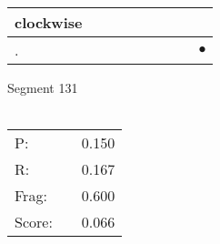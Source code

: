 \documentclass[landscape]{article}
\newcommand{\ssp}{\hspace{2pt}}
\newcommand{\mex}{\cellcolor{g}$\bullet$}
\begin{document}
\begin{tabular}{|l|p{10pt}|p{10pt}|p{10pt}|p{10pt}|p{10pt}|p{10pt}|p{10pt}|p{10pt}|}
\hline
\ssp clockwise \ssp&\hspace{2pt}&\hspace{2pt}&\hspace{2pt}&\hspace{2pt}&\hspace{2pt}&\hspace{2pt}&\hspace{2pt}&\hspace{2pt}\\
\hline
\ssp \cellcolor{ref7}. \ssp&\hspace{2pt}&\hspace{2pt}&\hspace{2pt}&\hspace{2pt}&\hspace{2pt}&\hspace{2pt}&\hspace{2pt}&\hspace{2pt}\mex\\
\hline
\end{tabular}

\vspace{6pt}
\noindent Segment 131\\\\
\noindent\begin{tabular}{lm{12pt}r}
\hline
P:&&0.150\\
R:&&0.167\\
Frag:&&0.600\\
Score:&&0.066\\
\end{tabular}

\newpage
\end{document}
